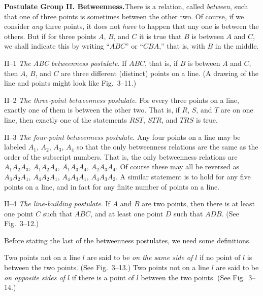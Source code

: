 \documentclass[11pt]{book}
\theoremstyle{bkplain}
\begin{document}
\medskip
\noindent\textbf{Postulate Group II. Betweenness.}\quad There is a relation,
called \emph{between}, such that one of three points is sometimes between the
other two. Of course, if we consider \emph{any} three points, it does not
\emph{have} to happen that any one is between the others. But if for three points
$A$, $B$, and $C$ it is true that $B$ is between $A$ and $C$, we shall indicate
this by writing ``$ABC$'' or ``$CBA$,'' that is, with $B$ in the middle.

\medskip
\noindent II--1 \emph{The ABC betweenness postulate}. If $ABC$, that is, if $B$
is between $A$ and $C$, then $A$, $B$, and $C$ are three different (distinct)
points on a line. (A drawing of the line and points might look like Fig.~3--11.)

\FIGIIIELEVENTWELVE

\medskip
\noindent II--2 \emph{The three-point betweenness postulate}. For every three
points on a line, exactly one of them is between the other two. That is, if $R$,
$S$, and $T$ are on one line, then exactly one of the statements $RST$, $STR$,
and $TRS$ is true.

\medskip
\noindent II--3 \emph{The four-point betweenness postulate}. Any four points on a
line may be labeled $A_1$, $A_2$, $A_3$, $A_4$ so that the only betweenness
relations are the same as the order of the subscript numbers. That is, the only
betweenness relations are $A_1A_2A_3$, $A_1A_2A_4$, $A_1A_3A_4$, $A_2A_3A_4$. Of
course these may all be reversed as $A_3A_2A_1$, $A_4A_2A_1$, $A_4A_3A_1$,
$A_4A_3A_2$. A similar statement is to hold for any five points on a line, and in
fact for any finite number of points on a line.

\medskip
\noindent II--4 \emph{The line-building postulate}. If $A$ and $B$ are two
points, then there is at least one point $C$ such that $ABC$, and at least one
point $D$ such that $ADB$. (See Fig.~3--12.)

\medskip
Before stating the last of the betweenness postulates, we need some definitions.

\begin{definition}
Two points not on a line $l$ are said to be \emph{on the same side of $l$} if no
point of $l$ is between the two points. (See Fig.~3--13.) Two points not on a
line $l$ are said to be \emph{on opposite sides of $l$} if there is a point of
$l$ between the two points. (See Fig.~3--14.)
\end{definition}

\FIGIIITHIRTEENFOURTEEN
\end{document}
